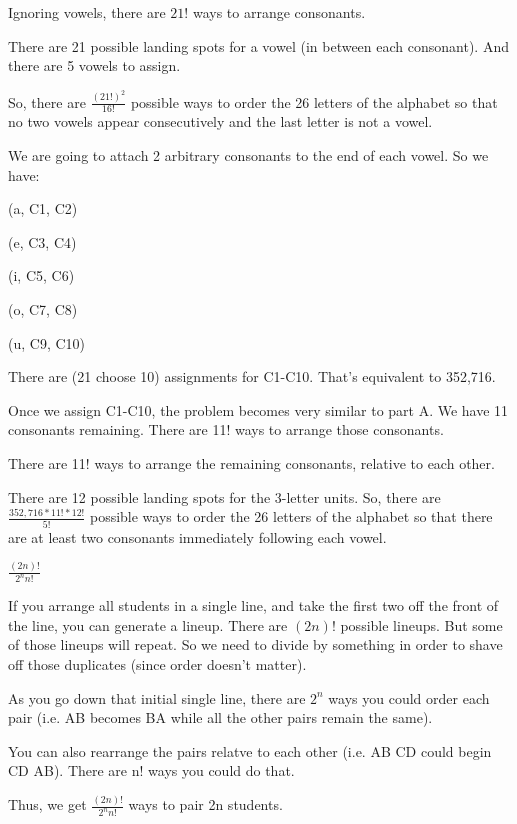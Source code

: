 \documentclass{6042}
\author{Ian Miller}
\begin{document}



Ignoring vowels, there are $21!$ ways to arrange consonants.

There are 21 possible landing spots for a vowel (in between each consonant). And there are 5 vowels to assign.

So, there are $\frac{(21!)^2}{16!}$ possible ways to order the 26 letters of the alphabet so that no two vowels appear consecutively and the last letter is not a vowel.


We are going to attach 2 arbitrary consonants to the end of each vowel. So we have:

(a, C1, C2)

(e, C3, C4)

(i, C5, C6)

(o, C7, C8)

(u, C9, C10)

There are (21 choose 10) assignments for C1-C10. That's equivalent to 352,716.

Once we assign C1-C10, the problem becomes very similar to part A. We have 11 consonants remaining. There are 11! ways to arrange those consonants.

There are 11! ways to arrange the remaining consonants, relative to each other.

There are 12 possible landing spots for the 3-letter units. So, there are $\frac{352,716 * 11! * 12!}{5!}$ possible ways to order the
26 letters of the alphabet so that there are at least two consonants immediately following each vowel.


$\frac{(2n)!}{2^nn!}$

If you arrange all students in a single line, and take the first two off the front of the line,
you can generate a lineup. There are $(2n)!$ possible lineups. But some of those lineups will repeat.
So we need to divide by something in order to shave off those duplicates (since order doesn't matter).

As you go down that initial single line, there are $2^n$ ways you could order each pair (i.e. AB becomes BA while all the other pairs remain the same).

You can also rearrange the pairs relatve to each other (i.e. AB CD could begin CD AB). There are n! ways you could do that.

Thus, we get $\frac{(2n)!}{2^nn!}$ ways to pair 2n students.
\end{document}
